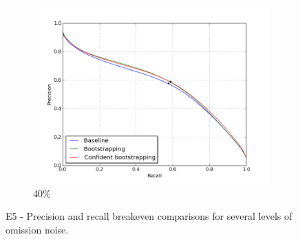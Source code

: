\begin{figure}[H]
\begin{subfigure}{0.31\textwidth}
\end{subfigure}
\hspace*{\fill} %
\begin{subfigure}{0.31\textwidth}
\includegraphics[width=\textwidth]{figs/E2/pr_4.png}
\caption{40\%} \label{fig:app_E2_4_pr}
\vspace{0.1cm} %
\end{subfigure}
\caption{E5 - Precision and recall breakeven comparisons for several levels of omission noise.} \label{fig:E2_all_pr}
\end{figure}

